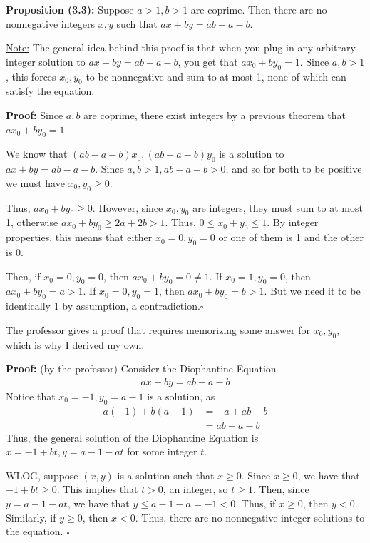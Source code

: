 \documentclass{article}
\newcommand*{\qed}{\hfill$\square$}%
\newenvironment{aside}{\begin{siderules}\setlength{\leftskip}{0.3cm}}{\end{siderules}\setlength{\leftskip}{0pt}}
\begin{document}
\textbf{Proposition (3.3):} Suppose $a>1, b>1$ are coprime. Then there are no nonnegative integers $x,y$ such that $ax+by=ab-a-b$. 

\underline{Note:} The general idea behind this proof is that when you plug in any arbitrary integer solution to $ax+by=ab-a-b$, you get that $ax_0+by_0=1$. Since $a,b>1$, this forces $x_0,y_0$ to be nonnegative and sum to at most 1, none of which can satisfy the equation.

\textbf{Proof:} Since $a,b$ are coprime, there exist integers by a previous theorem that $ax_0+by_0=1$. 

We know that $(ab-a-b)x_0,(ab-a-b)y_0$ is a solution to $ax+by=ab-a-b$. Since $a,b>1, ab-a-b>0$, and so for both to be positive we must have $x_0,y_0\geq 0$. 

Thus, $ax_0+by_0\geq 0$. However, since $x_0,y_0$ are integers, they must sum to at most 1, otherwise $ax_0+by_0\geq 2a+2b>1$. Thus, $0\leq x_0+y_0\leq 1$. By integer properties, this means that either $x_0=0,y_0=0$ or one of them is 1 and the other is 0. 

Then, if $x_0=0,y_0=0$, then $ax_0+by_0=0\neq 1$. If $x_0=1,y_0=0$, then $ax_0+by_0=a>1$. If $x_0=0,y_0=1$, then $ax_0+by_0=b>1$. But we need it to be identically 1 by assumption, a contradiction.\qed

\begin{aside}
The professor gives a proof that requires memorizing some answer for $x_0,y_0$, which is why I derived my own. 

\textbf{Proof:} (by the professor) Consider the Diophantine Equation \begin{align*}
    ax+by=ab-a-b
\end{align*}Notice that $x_0=-1, y_0=a-1$ is a solution, as \begin{align*}
    a(-1) + b(a-1) &= -a + ab - b \\
                   &= ab - a - b
\end{align*}
Thus, the general solution of the Diophantine Equation is $x=-1+bt,y=a-1-at$ for some integer $t$. 

WLOG, suppose $(x,y)$ is a solution such that $x\geq 0$. Since $x\geq 0$, we have that $-1+bt\geq 0$. This implies that $t>0$, an integer, so $t\geq 1$. Then, since $y=a-1-at$, we have that $y\leq a-1-a=-1<0$. Thus, if $x\geq 0$, then $y<0$. Similarly, if $y\geq 0$, then $x<0$. Thus, there are no nonnegative integer solutions to the equation. \qed
\end{aside}
\end{document}
